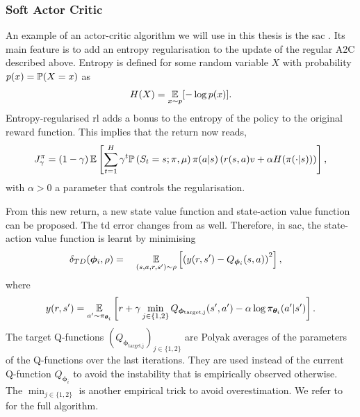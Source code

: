 \subsubsection{Soft Actor Critic}
An example of an actor-critic algorithm we will use in this thesis is the \gls{sac} \cite{haarnoja2018soft}. 
Its main feature is to add an entropy regularisation to the update of the regular A2C described above.
Entropy is defined for some random variable $X$ with probability $p(x)=\mathbb{P}(X=x)$ as
\begin{align*}
    H(X) = \operatorname*{\mathbb{E}}_{x\sim p}[-\log p(x)].
\end{align*}
Entropy-regularised \gls{rl} adds a bonus to the entropy of the policy to the original reward function. 
This implies that the return now reads,
\begin{align}
\label{eq:discounted_reward_entropy}
    \expectedreturn[\gamma] = (1-\gamma)\expectedvalue\left[\sum_{t=1}^H \gamma^t  \probability\left(S_t=s; \pi,\mu\right)\pi(a\vert s) \left(r(s,a)v + \alpha \entropy(\pi(\cdot\vert s))\right)\right],
\end{align}
with $\alpha>0$ a parameter that controls the regularisation.

From this new return, a new state value function and state-action value function can be proposed. The \gls{td} error changes from  as well. 
Therefore, in \gls{sac}, the state-action value function is learnt by minimising 
\begin{align}
\label{eq:update_sac}
    \delta_{TD}(\boldsymbol\phi_i,\rho) &= \quad\operatorname*{\mathbb{E}}_{(s,a,r,s')\sim\rho}\left[\left(y(r,s') - Q_{\boldsymbol\phi_{i}}(s,a)\right)^2\right],
\end{align}
where
\begin{align*}
    y(r,s') = \operatorname*{\mathbb{E}}_{a'\sim\pi_{\boldsymbol\theta_{i}}}\left[r+\gamma \min_{j\in\{1,2\}}Q_{\boldsymbol\phi_{\text{target,j}}}(s',a')-\alpha \log\pi_{\boldsymbol\theta_{i}}(a'\vert s') \right].
\end{align*}
The target Q-functions $(Q_{\boldsymbol\phi_{\text{target,j}}})_{j\in\{1,2\}}$ are Polyak averages of the parameters of the Q-functions over the last iterations. They are used instead of the current Q-function $Q_{\boldsymbol\phi_i}$ to avoid the instability that is empirically observed otherwise.
The $\textstyle\min_{j\in\{1,2\}}$ is another empirical trick to avoid overestimation. 
We refer to \cite{haarnoja2018soft} for the full algorithm.


